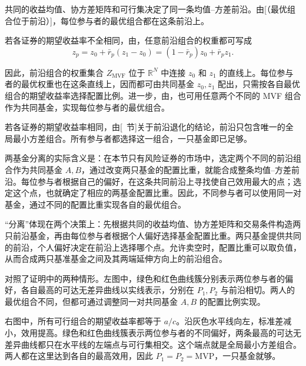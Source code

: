\begin{solution}[label-content={证明},blank-type=none]
共同的收益均值、协方差矩阵和可行集决定了同一条均值--方差前沿。由[（最优组合位于前沿）]，每位参与者的最优组合都在这条前沿上。

若各证券的期望收益率不全相同，由，任意前沿组合的权重都可写成
\[
 z_p=z_0+\bar r_p(z_1-z_0)=(1-\bar r_p)z_0+\bar r_pz_1.
\]

因此，前沿组合的权重集合 $Z_{\mathrm{MVF}}$ 位于 $\mathbb R^N$ 中连接 $z_0$ 和 $z_1$ 的直线上。每位参与者的最优权重也在这条直线上，因而都可由共同基金 $z_0,z_1$ 配出，只需按各自最优组合的期望收益率选择配置比例。进一步，由，也可用任意两个不同的 MVF 组合作为共同基金，实现每位参与者的最优组合。

若各证券的期望收益率相同，由[~节]关于前沿退化的结论，前沿只包含唯一的全局最小方差组合。所有参与者都选择这一组合，一只基金即已足够。
\end{solution}

两基金分离的实际含义是：在本节只有风险证券的市场中，选定两个不同的前沿组合作为共同基金 $A,B$，通过改变两只基金的配置比重，就能合成整条均值--方差前沿。每位参与者根据自己的偏好，在这条共同前沿上寻找使自己效用最大的点；选定这个点，也就确定了相应的两基金配置比重。因此，不同参与者可以使用同一对基金，通过不同的配置比重实现各自的最优组合。

“分离”体现在两个决策上：先根据共同的收益均值、协方差矩阵和交易条件构造两只前沿基金，再由每位参与者根据个人偏好选择基金配置比重。两只基金提供共同的前沿，个人偏好决定在前沿上选择哪个点。允许卖空时，配置比重可以取负值，从而合成两只基准基金之间及其两端延伸方向上的前沿组合。

 对照了证明中的两种情形。左图中，绿色和红色曲线簇分别表示两位参与者的偏好，各自最高的可达无差异曲线以实线表示，分别在 $P_1,P_2$ 与前沿相切。两人的最优组合不同，但都可通过调整同一对共同基金 $A,B$ 的配置比例实现。

右图中，所有可行组合的期望收益率都等于 $a/c$。沿灰色水平线向左，标准差减小，效用提高。绿色和红色曲线簇表示两位参与者的不同偏好，两条最高的可达无差异曲线都只在水平线的左端点与可行集相交。这个端点就是全局最小方差组合。两人都在这里达到各自的最高效用，因此 $P_1=P_2=\mathrm{MVP}$，一只基金就够。

\begin{center}
\begin{minipage}{\linewidth}
\centering
\renewcommand{\thewjFigure}{\thechapter.S\arabic{wjFigure}}%
%
\par
{}
\end{minipage}
\end{center}

